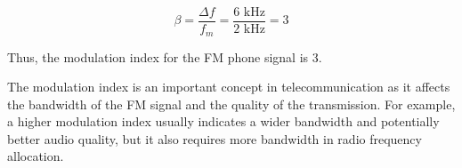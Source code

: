 \[
\beta = \frac{\Delta f}{f_m} = \frac{6 \text{ kHz}}{2 \text{ kHz}} = 3
\]

Thus, the modulation index for the FM phone signal is 3. 

The modulation index is an important concept in telecommunication as it affects the bandwidth of the FM signal and the quality of the transmission. For example, a higher modulation index usually indicates a wider bandwidth and potentially better audio quality, but it also requires more bandwidth in radio frequency allocation.

